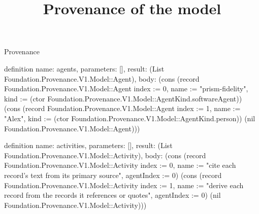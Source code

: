 \begin{lexlean}{Provenance}
\title{Provenance of the model}
\begin{semanticmodule}
definition{
  name: agents,
  parameters: [],
  result: (List Foundation.Provenance.V1.Model::Agent),
  body: (cons (record Foundation.Provenance.V1.Model::Agent {index := 0, name := "prism-fidelity", kind := (ctor Foundation.Provenance.V1.Model::AgentKind.softwareAgent)}) (cons (record Foundation.Provenance.V1.Model::Agent {index := 1, name := "Alex", kind := (ctor Foundation.Provenance.V1.Model::AgentKind.person)}) (nil Foundation.Provenance.V1.Model::Agent)))
}

definition{
  name: activities,
  parameters: [],
  result: (List Foundation.Provenance.V1.Model::Activity),
  body: (cons (record Foundation.Provenance.V1.Model::Activity {index := 0, name := "cite each record's text from its primary source", agentIndex := 0}) (cons (record Foundation.Provenance.V1.Model::Activity {index := 1, name := "derive each record from the records it references or quotes", agentIndex := 0}) (nil Foundation.Provenance.V1.Model::Activity)))
}


\end{semanticmodule}
\end{lexlean}
